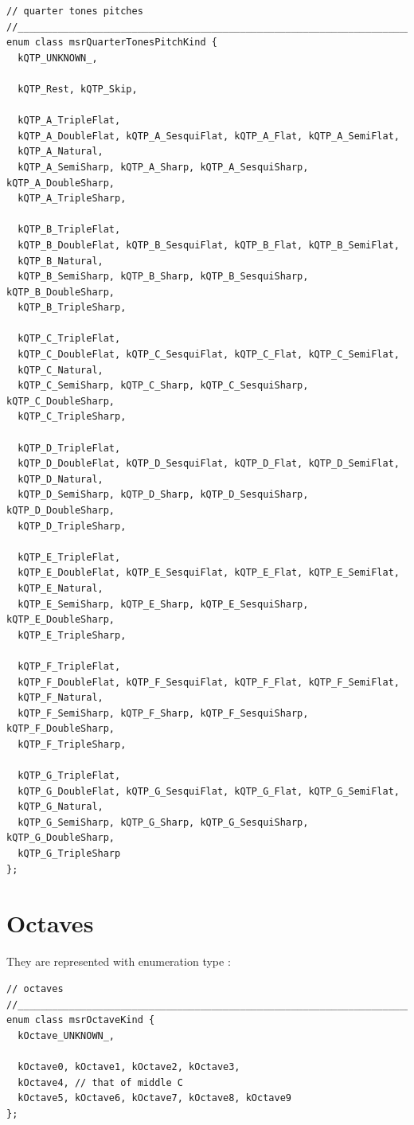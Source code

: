 \begin{lstlisting}[language=CPlusPlus]
// quarter tones pitches
//______________________________________________________________________________
enum class msrQuarterTonesPitchKind {
  kQTP_UNKNOWN_,

  kQTP_Rest, kQTP_Skip,

  kQTP_A_TripleFlat,
  kQTP_A_DoubleFlat, kQTP_A_SesquiFlat, kQTP_A_Flat, kQTP_A_SemiFlat,
  kQTP_A_Natural,
  kQTP_A_SemiSharp, kQTP_A_Sharp, kQTP_A_SesquiSharp, kQTP_A_DoubleSharp,
  kQTP_A_TripleSharp,

  kQTP_B_TripleFlat,
  kQTP_B_DoubleFlat, kQTP_B_SesquiFlat, kQTP_B_Flat, kQTP_B_SemiFlat,
  kQTP_B_Natural,
  kQTP_B_SemiSharp, kQTP_B_Sharp, kQTP_B_SesquiSharp, kQTP_B_DoubleSharp,
  kQTP_B_TripleSharp,

  kQTP_C_TripleFlat,
  kQTP_C_DoubleFlat, kQTP_C_SesquiFlat, kQTP_C_Flat, kQTP_C_SemiFlat,
  kQTP_C_Natural,
  kQTP_C_SemiSharp, kQTP_C_Sharp, kQTP_C_SesquiSharp, kQTP_C_DoubleSharp,
  kQTP_C_TripleSharp,

  kQTP_D_TripleFlat,
  kQTP_D_DoubleFlat, kQTP_D_SesquiFlat, kQTP_D_Flat, kQTP_D_SemiFlat,
  kQTP_D_Natural,
  kQTP_D_SemiSharp, kQTP_D_Sharp, kQTP_D_SesquiSharp, kQTP_D_DoubleSharp,
  kQTP_D_TripleSharp,

  kQTP_E_TripleFlat,
  kQTP_E_DoubleFlat, kQTP_E_SesquiFlat, kQTP_E_Flat, kQTP_E_SemiFlat,
  kQTP_E_Natural,
  kQTP_E_SemiSharp, kQTP_E_Sharp, kQTP_E_SesquiSharp, kQTP_E_DoubleSharp,
  kQTP_E_TripleSharp,

  kQTP_F_TripleFlat,
  kQTP_F_DoubleFlat, kQTP_F_SesquiFlat, kQTP_F_Flat, kQTP_F_SemiFlat,
  kQTP_F_Natural,
  kQTP_F_SemiSharp, kQTP_F_Sharp, kQTP_F_SesquiSharp, kQTP_F_DoubleSharp,
  kQTP_F_TripleSharp,

  kQTP_G_TripleFlat,
  kQTP_G_DoubleFlat, kQTP_G_SesquiFlat, kQTP_G_Flat, kQTP_G_SemiFlat,
  kQTP_G_Natural,
  kQTP_G_SemiSharp, kQTP_G_Sharp, kQTP_G_SesquiSharp, kQTP_G_DoubleSharp,
  kQTP_G_TripleSharp
};
\end{lstlisting}


\section{Octaves}\label{Octaves}

They are represented with enumeration type {\tt }:
\begin{lstlisting}[language=CPlusPlus]
// octaves
//______________________________________________________________________________
enum class msrOctaveKind {
  kOctave_UNKNOWN_,

  kOctave0, kOctave1, kOctave2, kOctave3,
  kOctave4, // that of middle C
  kOctave5, kOctave6, kOctave7, kOctave8, kOctave9
};
\end{lstlisting}

